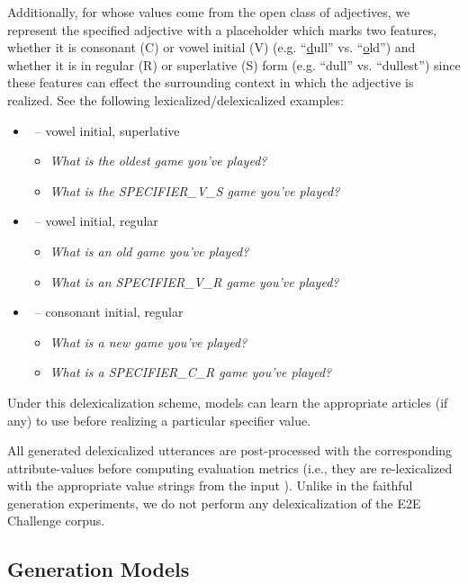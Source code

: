 \label{app:specifier} Additionally, for  whose values come from
the open class of adjectives, we represent the specified adjective with a
placeholder which marks two features, whether it is consonant (C) or vowel
initial (V) (e.g.  ``\uline{d}ull'' vs. ``\uline{o}ld'') and whether it is in
regular (R) or superlative (S) form (e.g. ``dull'' vs. ``dullest'') since these
features can effect the surrounding context in which the adjective is realized.
See the following lexicalized/delexicalized examples:
\begin{itemize}
        \item {}~-- vowel initial, superlative
\begin{itemize}
    \item \textit{What is the oldest game you've played?}
    \item \textit{What is the SPECIFIER\_V\_S game you've played?}
\end{itemize}
        \item {}~-- vowel initial, regular

\begin{itemize}
    \item \textit{What is an old game you've played?}
    \item \textit{What is an SPECIFIER\_V\_R game you've played?}
\end{itemize}

        \item {}~-- consonant initial, regular

\begin{itemize}
    \item \textit{What is a new game you've played?}
    \item \textit{What is a SPECIFIER\_C\_R game you've played?}
\end{itemize}
\end{itemize}
Under this delexicalization scheme, models can learn the appropriate articles
(if any) to use before realizing a particular specifier value.

All generated delexicalized utterances are post-processed with the
corresponding attribute-values before computing evaluation metrics (i.e., they
are re-lexicalized with the appropriate value strings from the input
\meaningrepresentation). Unlike in the faithful generation experiments, we do
not perform any delexicalization of the E2E Challenge corpus.

\subsection{Generation Models}

